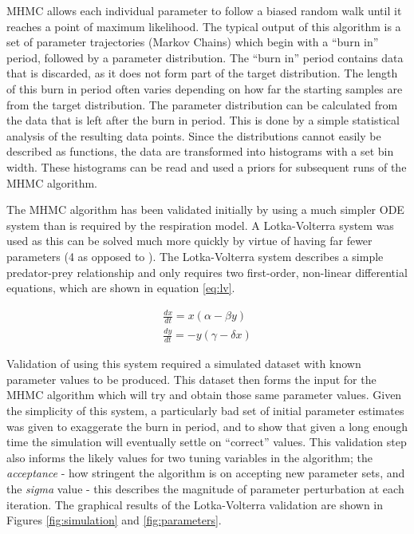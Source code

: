 MHMC allows each individual parameter to follow a biased random walk until it reaches a point of maximum likelihood. The typical output of this algorithm is a set of parameter trajectories (Markov Chains) which begin with a ``burn in'' period, followed by a parameter distribution. The ``burn in'' period contains data that is discarded, as it does not form part of the target distribution. The length of this burn in period often varies depending on how far the starting samples are from the target distribution. The parameter distribution can be calculated from the data that is left after the burn in period. This is done by a simple statistical analysis of the resulting data points. Since the distributions cannot easily be described as functions, the data are transformed into histograms with a set bin width. These histograms can be read and used a priors for subsequent runs of the MHMC algorithm.

The MHMC algorithm has been validated initially by using a much simpler ODE system than is required by the respiration model. A Lotka-Volterra system was used as this can be solved much more quickly by virtue of having far fewer parameters (4 as opposed to ). The Lotka-Volterra system describes a simple predator-prey relationship and only requires two first-order, non-linear differential equations, which are shown in equation \ref{eq:lv}.

\begin{eqnarray}
\frac{dx}{dt} = x (\alpha - \beta y)\nonumber \\
\frac{dy}{dt} = -y (\gamma - \delta x)
\label{eq:lv}
\end{eqnarray}

Validation of using this system required a simulated dataset with known parameter values to be produced. This dataset then forms the input for the MHMC algorithm which will try and obtain those same parameter values. Given the simplicity of this system, a particularly bad set of initial parameter estimates was given to exaggerate the burn in period, and to show that given a long enough time the simulation will eventually settle on ``correct'' values. This validation step also informs the likely values for two tuning variables in the algorithm; the \textit{acceptance} - how stringent the algorithm is on accepting new parameter sets, and the \textit{sigma} value - this describes the magnitude of parameter perturbation at each iteration.
The graphical results of the Lotka-Volterra validation are shown in Figures \ref{fig:simulation} and \ref{fig:parameters}.

